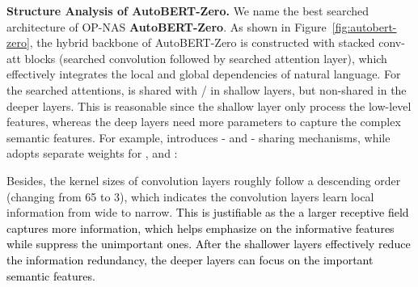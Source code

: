 \documentclass[letterpaper]{article} \usepackage{aaai22}  \usepackage{times}  \usepackage{helvet}  \usepackage{courier}  \usepackage[hyphens]{url}  \usepackage{graphicx} \urlstyle{rm} \def\UrlFont{\rm}  \usepackage{natbib}  \usepackage{caption} \DeclareCaptionStyle{ruled}{labelfont=normalfont,labelsep=colon,strut=off} \frenchspacing  \setlength{\pdfpagewidth}{8.5in}  \setlength{\pdfpageheight}{11in}  \usepackage{algorithm}
\newcommand{\prj}[1]{\textcolor{black}{#1}} \newcommand{\prjj}[1]{\textcolor{black}{#1}} \newcommand{\jhh}[1]{\textcolor{black}{#1}} \newcommand{\jh}[1]{\textcolor{black}{#1}} \newcommand{\sh}[1]{\textcolor{black}{#1}} \usepackage{multirow}
\begin{document}
\textbf{Structure Analysis of AutoBERT-Zero.} We name the best searched architecture of OP-NAS \textbf{AutoBERT-Zero}.
As shown in Figure~\ref{fig:autobert-zero},  
the hybrid backbone of AutoBERT-Zero is constructed with stacked conv-att blocks (searched convolution followed by searched attention layer), which effectively integrates the local and global dependencies of natural language.
For the searched attentions, 
 is shared with / in shallow layers, but non-shared in the deeper layers. This is reasonable since the shallow layer only process the low-level features, whereas the deep layers need more parameters to capture the complex semantic features. For example, 
 introduces - and - sharing mechanisms, while  adopts separate weights for ,  and :
\vspace{-3mm}
\begin{small}

\end{small}
\hspace{-2mm}
Besides, the kernel sizes of convolution layers roughly follow a descending order (changing from 65 to 3), which indicates the convolution layers learn local information from wide to narrow. \prj{This is justifiable as the a  larger receptive field captures more information, which helps emphasize on the informative features while suppress the unimportant ones. After the shallower layers effectively reduce the information redundancy, the deeper layers can focus on the important semantic features.} 
\end{document}
